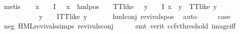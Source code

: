 \begin{isabellebody}
\ metis\isanewline
\ \ \isamarkupfalse%
\ {\isachardoublequoteopen}{\isacharparenleft}{\kern0pt}{\isasymexists}x\ {\isasymin}\ {\isacharparenleft}{\kern0pt}{\isasymPhi}\ {\isacharbackquote}{\kern0pt}\ I{\isacharparenright}{\kern0pt}{\isachardot}{\kern0pt}\ {\isacharparenleft}{\kern0pt}{\isasymexists}{\isasymalpha}\ {\isasymchi}{\isachardot}{\kern0pt}\ {\isacharparenleft}{\kern0pt}x\ {\isacharequal}{\kern0pt}\ hml{\isacharunderscore}{\kern0pt}pos\ {\isasymalpha}\ {\isasymchi}{\isacharparenright}{\kern0pt}\ {\isasymand}\ TT{\isacharunderscore}{\kern0pt}like\ {\isasymchi}{\isacharparenright}{\kern0pt}\ {\isasymand}\ {\isacharparenleft}{\kern0pt}{\isasymforall}y\ {\isasymin}\ {\isacharparenleft}{\kern0pt}{\isasymPhi}\ {\isacharbackquote}{\kern0pt}\ I{\isacharparenright}{\kern0pt}{\isachardot}{\kern0pt}\ x\ {\isasymnoteq}\ y\ {\isasymlongrightarrow}\ TT{\isacharunderscore}{\kern0pt}like\ y{\isacharparenright}{\kern0pt}{\isacharparenright}{\kern0pt}\isanewline
\ \ \ \ \ \ \ \ \ \ {\isasymor}\ {\isacharparenleft}{\kern0pt}{\isasymforall}y\ {\isasymin}\ {\isacharparenleft}{\kern0pt}{\isasymPhi}\ {\isacharbackquote}{\kern0pt}\ I{\isacharparenright}{\kern0pt}{\isachardot}{\kern0pt}TT{\isacharunderscore}{\kern0pt}like\ y{\isacharparenright}{\kern0pt}{\isachardoublequoteclose}\ \isanewline
\ \ \ \ \isamarkupfalse%
\ hml{\isacharunderscore}{\kern0pt}conj{\isacharparenleft}{\kern0pt}{}{\isacharparenright}{\kern0pt}\ revivals{\isacharunderscore}{\kern0pt}pos\ \isamarkupfalse%
\ auto\isanewline
\ \ \isamarkupfalse%
\ \isamarkupfalse%
\ {\isacharquery}{\kern0pt}case\ \isamarkupfalse%
\ neg\ HML{\isacharunderscore}{\kern0pt}revivals{\isachardot}{\kern0pt}simps\ revivals{\isacharunderscore}{\kern0pt}conj\isanewline
\ \ \ \ \isamarkupfalse%
\ {\isacharparenleft}{\kern0pt}smt\ {\isacharparenleft}{\kern0pt}verit{\isacharcomma}{\kern0pt}\ ccfv{\isacharunderscore}{\kern0pt}threshold{\isacharparenright}{\kern0pt}\ image{\isacharunderscore}{\kern0pt}iff{\isacharparenright}{\kern0pt}\isanewline
{}\isamarkupfalse%
%
\endisatagproof
{\isafoldproof}%
%
\isadelimproof
\isanewline
%
\endisadelimproof
\isanewline
{}\isamarkupfalse%
\isanewline
%
\isadelimtheory
%
\endisadelimtheory
%
\isatagtheory
{}\isamarkupfalse%
%
\endisatagtheory
{\isafoldtheory}%
%
\isadelimtheory
%
\endisadelimtheory
%
\end{isabellebody}%
\endinput
